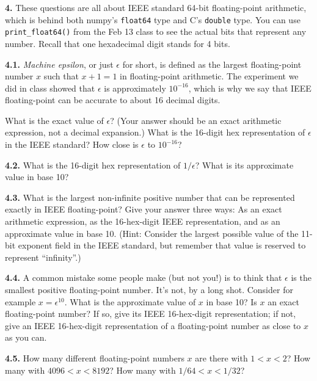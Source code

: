 \documentclass[11pt]{article}
\begin{document}
\par\bigskip
{\bf 4.}
These questions are all about IEEE standard 64-bit floating-point arithmetic,
which is behind both numpy's {\tt float64} type and C's {\tt double} type.
You can use {\tt print\_float64()} from the Feb 13 class to see
the actual bits that represent any number.
Recall that one hexadecimal digit stands for 4 bits.

\par\medskip
{\bf 4.1.}
{\em Machine epsilon}, or just $\epsilon$ for short, is defined as the largest
floating-point number $x$ such that $x + 1 = 1$ in floating-point arithmetic.
The experiment we did in class showed that $\epsilon$ is approximately $10^{-16}$,
which is why we say that IEEE floating-point can be accurate to
about 16 decimal digits.

What is the exact value of $\epsilon$? (Your answer should be an exact arithmetic
expression, not a decimal expansion.) What is the 16-digit hex representation of
$\epsilon$ in the IEEE standard? How close is $\epsilon$ to $10^{-16}$?

\par\medskip
{\bf 4.2.}
What is the 16-digit hex representation of $1/\epsilon$? What is its approximate
value in base 10?

\par\medskip
{\bf 4.3.}
What is the largest non-infinite positive number that can be represented exactly
in IEEE floating-point? Give your answer three ways: As an exact arithmetic
expression, as the 16-hex-digit IEEE representation, and as an approximate
value in base 10. (Hint: Consider the largest possible value of the 11-bit
exponent field in the IEEE standard, but remember that value is reserved
to represent ``infinity''.)

\par\medskip
{\bf 4.4.}
A common mistake some people make (but not you!) is to think that $\epsilon$ is
the smallest positive floating-point number. It's not, by a long shot. Consider
for example $x = \epsilon^{10}$. What is the approximate value of $x$ in base 10?
Is $x$ an exact floating-point number? If so, give its IEEE 16-hex-digit representation;
if not, give an IEEE 16-hex-digit representation of a floating-point number as
close to $x$ as you can.

\par\medskip 
{\bf 4.5.}
How many different floating-point numbers $x$ are there with $1 < x < 2$?
How many with $4096 < x < 8192$?  How many with $1/64 < x < 1/32$?
\end{document}
